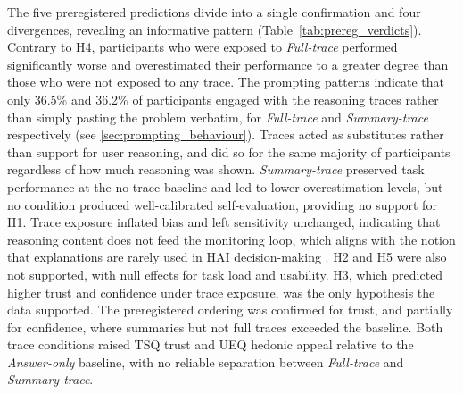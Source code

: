 \documentclass[manuscript,review,anonymous]{acmart}
\begin{document}
The five preregistered predictions divide into a single confirmation and four divergences, revealing an informative pattern (Table~\ref{tab:prereg_verdicts}). Contrary to H4, participants who were exposed to \textit{Full-trace} performed significantly worse and overestimated their performance to a greater degree than those who were not exposed to any trace. %
The prompting patterns indicate that only 36.5\% and 36.2\% of participants engaged with the reasoning traces rather than simply pasting the problem verbatim, for \textit{Full-trace} and \textit{Summary-trace} respectively (see \autoref{sec:prompting_behaviour}). Traces acted as substitutes rather than support for user reasoning, and did so for the same majority of participants regardless of how much reasoning was shown. \textit{Summary-trace} preserved task performance at the no-trace baseline and led to lower overestimation levels, but no condition produced well-calibrated self-evaluation, providing no support for H1. Trace exposure inflated bias and left sensitivity unchanged, indicating that reasoning content does not feed the monitoring loop, which aligns with the notion that explanations are rarely used in HAI decision-making \cite{wang2021explanations}. H2 and H5 were also not supported, with null effects for task load and usability. H3, which predicted higher trust and confidence under trace exposure, was the only hypothesis the data supported. The preregistered ordering was confirmed for trust, and partially for confidence, where summaries but not full traces exceeded the baseline. Both trace conditions raised TSQ trust and UEQ hedonic appeal relative to the \textit{Answer-only} baseline, with no reliable separation between \textit{Full-trace} and \textit{Summary-trace}. 

\end{document}
